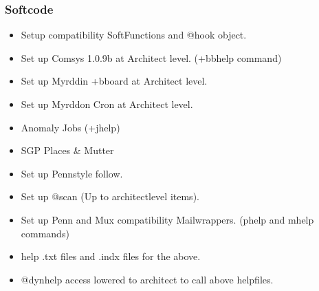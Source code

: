 \documentclass[letterpaper,10pt,english]{sphinxmanual}
\begin{document}
\subsubsection{Softcode}
\label{\detokenize{gettingstarted:softcode}}\begin{itemize}
\item {} 
\sphinxAtStartPar
Set\sphinxhyphen{}up compatibility SoftFunctions and @hook object.

\item {} 
\sphinxAtStartPar
Set up Comsys 1.0.9b at Architect level. (+bbhelp command)

\item {} 
\sphinxAtStartPar
Set up Myrddin +bboard at Architect level.

\item {} 
\sphinxAtStartPar
Set up Myrddon Cron at Architect level.

\item {} 
\sphinxAtStartPar
Anomaly Jobs (+jhelp)

\item {} 
\sphinxAtStartPar
SGP Places \& Mutter

\item {} 
\sphinxAtStartPar
Set up Penn\sphinxhyphen{}style follow.

\item {} 
\sphinxAtStartPar
Set up @scan (Up to architect\sphinxhyphen{}level items).

\item {} 
\sphinxAtStartPar
Set up Penn\sphinxhyphen{} and Mux compatibility Mailwrappers. (phelp and mhelp commands)

\item {} 
\sphinxAtStartPar
help .txt files and .indx files for the above.

\item {} 
\sphinxAtStartPar
@dynhelp access lowered to architect to call above helpfiles.

\end{itemize}
\end{document}

